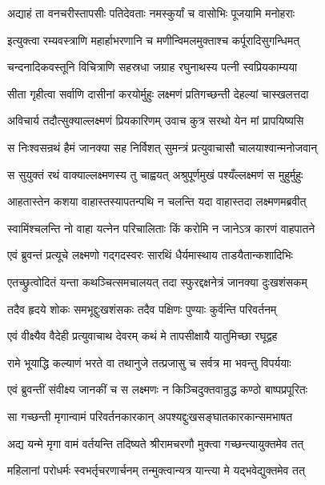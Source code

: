 \twolineshloka
{अद्याहं ता वनचरीस्तापसीः पतिदेवताः}
{नमस्कुर्यां च वासोभिः पूजयामि मनोहराः}%

\twolineshloka
{इत्युक्त्वा रम्यवस्त्राणि महार्हाभरणानि च}
{मणीन्विमलमुक्ताश्च कर्पूरादिसुगन्धिमत्}%

\twolineshloka
{चन्दनादिकवस्तूनि विचित्राणि सहस्रधा}
{जग्राह रघुनाथस्य पत्नी स्वप्रियकाम्यया}%

\twolineshloka
{सीता गृहीत्वा सर्वाणि दासीनां करयोर्मुहुः}
{लक्ष्मणं प्रतिगच्छन्ती देहल्यां चास्खलत्तदा}%

\twolineshloka
{अविचार्य तदौत्सुक्याल्लक्ष्मणं प्रियकारिणम्}
{उवाच कुत्र सरथो येन मां प्रापयिष्यसि}%

\twolineshloka
{स निःश्वसन्रथं हैमं जानक्या सह निर्विशत्}
{सुमन्त्रं प्रत्युवाचासौ चालयाश्वान्मनोजवान्}%

\twolineshloka
{स सुयुक्तं रथं वाक्याल्लक्ष्मणस्य तु चाह्वयत्}
{अश्रुपूर्णमुखं पश्यँल्लक्ष्मणं स मुहुर्मुहुः}%

\twolineshloka
{आहतास्तेन कशया वाहास्तस्यापतन्पथि}
{न चलन्ति यदा वाहास्तदा लक्ष्मणमब्रवीत्}%


\twolineshloka
{स्वामिंश्चलन्ति नो वाहा यत्नेन परिचालिताः}
{किं करोमि न जानेऽत्र कारणं वाहपातने}%

\twolineshloka
{एवं ब्रुवन्तं प्रत्यूचे लक्ष्मणो गद्गदस्वरः}
{सारथिं धैर्यमास्थाय ताडयैतान्कशादिभिः}%

\twolineshloka
{एतच्छ्रुत्वोदितं यन्ता कथञ्चित्समचालयत्}
{तदा स्फुरद्दक्षनेत्रं जानक्या दुःखशंसकम्}%

\twolineshloka
{तदैव हृदये शोकः समभूद्दुःखशंसकः}
{तदैव पक्षिणः पुण्याः कुर्वन्ति परिवर्तनम्}%

\twolineshloka
{एवं वीक्ष्यैव वैदेही प्रत्युवाचाथ देवरम्}
{कथं मे तापसीक्षायै यातुमिच्छा रघूद्वह}%

\twolineshloka
{रामे भूयाद्धि कल्याणं भरते वा तथानुजे}
{तत्प्रजासु च सर्वत्र मा भवन्तु विपर्ययाः}%

\twolineshloka
{एवं ब्रुवन्तीं संवीक्ष्य जानकीं च स लक्ष्मणः}
{न किञ्चिदुक्तवान्रुद्ध कण्ठो बाष्पप्रपूरितः}%

\twolineshloka
{सा गच्छन्ती मृगान्वामं परिवर्तनकारकान्}
{अपश्यद्दुःखसङ्घातकारकान्समभाषत}%

\twolineshloka
{अद्य यन्मे मृगा वामं वर्तयन्ति तदिष्यते}
{श्रीरामचरणौ मुक्त्वा गच्छन्त्यायुक्तमेव तत्}%

\twolineshloka
{महिलानां परोधर्मः स्वभर्तृचरणार्चनम्}
{तन्मुक्त्वान्यत्र यान्त्या मे यद्भवेद्युक्तमेव तत्}%

